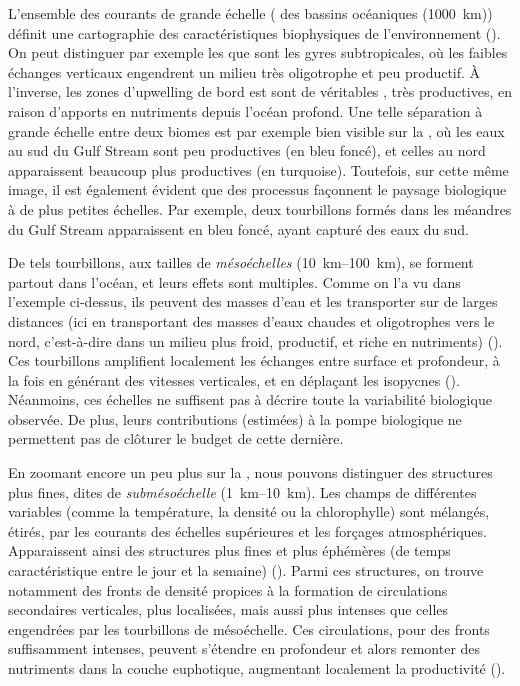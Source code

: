 L'ensemble des courants de grande échelle ( des bassins océaniques \OM(\qty{1000}{\km})) définit une cartographie des caractéristiques biophysiques de l'environnement (\cite{omand_2013,omand_2015a}).
On peut distinguer par exemple les  que sont les gyres subtropicales, où les faibles échanges verticaux engendrent un milieu très oligotrophe et peu productif.
À l'inverse, les zones d'upwelling de bord est sont de véritables , très productives, en raison d'apports en nutriments depuis l'océan profond.
Une telle séparation à grande échelle entre deux biomes est par exemple bien visible sur la , où les eaux au sud du Gulf Stream sont peu productives (en bleu foncé), et celles au nord apparaissent beaucoup plus productives (en turquoise).
Toutefois, sur cette même image, il est également évident que des processus façonnent le paysage biologique à de plus petites échelles.
Par exemple, deux tourbillons formés dans les méandres du Gulf Stream apparaissent en bleu foncé, ayant capturé des eaux du sud.

De tels tourbillons, aux tailles de \emph{mésoéchelles} \OM(\qtyrange{10}{100}{\km}), se forment partout dans l'océan, et leurs effets sont multiples.
Comme on l'a vu dans l'exemple ci-dessus, ils peuvent  des masses d'eau et les transporter sur de larges distances (ici en transportant des masses d'eaux chaudes et oligotrophes vers le nord, c'est-à-dire dans un milieu plus froid, productif, et riche en nutriments) (\cite{lehahn_2011}).
Ces tourbillons amplifient localement les échanges entre surface et profondeur, à la fois en générant des vitesses verticales, et en déplaçant les isopycnes (\cite{mcgillicuddy_1998}).
Néanmoins, ces échelles ne suffisent pas à décrire toute la variabilité biologique observée. De plus, leurs contributions (estimées) à la pompe biologique ne permettent pas de clôturer le budget de cette dernière.

En zoomant encore un peu plus sur la , nous pouvons distinguer des structures plus fines, dites de \emph{submésoéchelle} \OM(\qtyrange{1}{10}{\km}).
Les champs de différentes variables (comme la température, la densité ou la chlorophylle) sont mélangés, étirés, par les courants des échelles supérieures et les forçages atmosphériques.
Apparaissent ainsi des structures plus fines et plus éphémères (de temps caractéristique entre le jour et la semaine) (\cite{thomas_2008,mcwilliams_2016}).
Parmi ces structures, on trouve notamment des fronts de densité propices à la formation de circulations secondaires verticales, plus localisées, mais aussi plus intenses que celles engendrées par les tourbillons de mésoéchelle.
Ces circulations, pour des fronts suffisamment intenses, peuvent s'étendre en profondeur et alors remonter des nutriments dans la couche euphotique, augmentant localement la productivité (\cite{mahadevan_2016,levy_2018}).
\enlargethispage{-\baselineskip}

